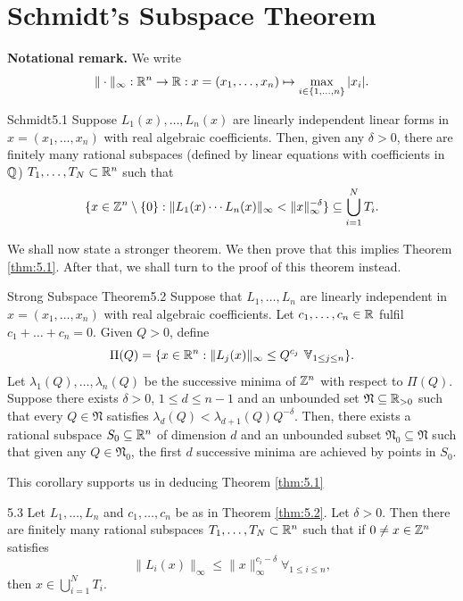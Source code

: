 \documentclass{Vorlesungstemplate_English} %
\begin{document}
\chapter{Schmidt's Subspace Theorem}
\textbf{Notational remark.} We write
\[ \|\cdot\|_{\infty}: \mathbb{R}^n \to \mathbb{R}: x=(x_1, \dots, x_n) \mapsto \max_{i \in \{ 1, \dots, n\}}|x_i|.\]
\begin{theorem}{Schmidt}{5.1}
  Suppose $L_1(x), \dots, L_n(x)$ are linearly independent linear forms in $x = (x_1, \dots, x_n)$ with real algebraic coefficients. Then, given any $\delta > 0$, there are finitely many rational subspaces (defined by linear equations with coefficients in $\mathbb{Q}$) $T_1, \dots, T_N \subset \mathbb{R}^n$ such that
  \[ \{ x \in \mathbb{Z}^n \setminus \{ 0\}: \|L_1(x)\cdots L_n(x)\|_{\infty} < \|x\|_{\infty}^{-\delta}\} \subseteq \bigcup_{i=1}^N T_i.\]
\end{theorem}
\noindent We shall now state a stronger theorem. We then prove that this implies Theorem \ref{thm:5.1}. After that, we shall turn to the proof of this theorem instead.
\begin{theorem}{Strong Subspace Theorem}{5.2}
  Suppose that $L_1, \dots, L_n$ are linearly independent in $x = (x_1, \dots, x_n)$ with real algebraic coefficients. Let $c_1, \dots, c_n \in \mathbb{R}$ fulfil $c_1+\dots+c_n = 0$. Given $Q > 0$, define
  \[ \Pi(Q) = \{ x \in\R^n: \|L_j(x)\|_{\infty} \leq Q^{c_j} \forall_{1 \leq j \leq n}\}.\]
  Let $\lambda_1(Q), \dots, \lambda_n(Q)$ be the successive minima of $\mathbb{Z}^n$ with respect to $\Pi(Q)$. Suppose there exists $\delta > 0$, $1 \leq d \leq n-1$ and an unbounded set $\mathfrak N \subseteq \mathbb{R}_{> 0}$ such that every $Q \in \mathfrak N$ satisfies $\lambda_d(Q) < \lambda_{d+1}(Q)Q^{-\delta}$. Then, there exists a rational subspace $S_0 \subseteq \mathbb{R}^n$ of dimension $d$ and an unbounded subset $\mathfrak N_0 \subseteq \mathfrak N$ such that given any $Q \in \mathfrak N_0$, the first $d$ successive minima are achieved by points in $S_0$.
\end{theorem}
\noindent This corollary supports us in deducing Theorem \ref{thm:5.1}
\begin{corollary}{}{5.3}
  Let $L_1, \dots, L_n$ and $c_1, \dots, c_n$ be as in Theorem \ref{thm:5.2}. Let $\delta > 0$. Then there are finitely many rational subspaces $T_1, \dots, T_N \subset \mathbb{R}^n$ such that if $0 \neq x \in \mathbb{Z}^n$ satisfies \begin{equation}\label{eq:cor:5.3} \|L_i(x)\|_{\infty} \leq \|x\|_{\infty}^{c_i-\delta} \forall_{1 \leq i \leq n}, \tag{$*$}\end{equation} then $x \in \bigcup_{i=1}^N T_i$.
\end{corollary}
\end{document}

